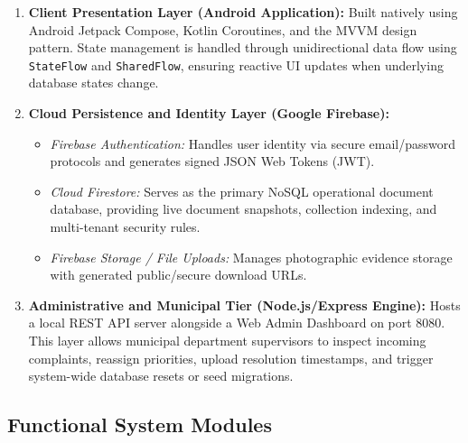 \documentclass[conference]{IEEEtran}
\begin{document}
\begin{enumerate}
    \item \textbf{Client Presentation Layer (Android Application):} Built natively using Android Jetpack Compose, Kotlin Coroutines, and the MVVM design pattern. State management is handled through unidirectional data flow using \texttt{StateFlow} and \texttt{SharedFlow}, ensuring reactive UI updates when underlying database states change.
    \item \textbf{Cloud Persistence and Identity Layer (Google Firebase):} 
    \begin{itemize}
        \item \textit{Firebase Authentication:} Handles user identity via secure email/password protocols and generates signed JSON Web Tokens (JWT).
        \item \textit{Cloud Firestore:} Serves as the primary NoSQL operational document database, providing live document snapshots, collection indexing, and multi-tenant security rules.
        \item \textit{Firebase Storage / File Uploads:} Manages photographic evidence storage with generated public/secure download URLs.
    \end{itemize}
    \item \textbf{Administrative and Municipal Tier (Node.js/Express Engine):} Hosts a local REST API server alongside a Web Admin Dashboard on port 8080. This layer allows municipal department supervisors to inspect incoming complaints, reassign priorities, upload resolution timestamps, and trigger system-wide database resets or seed migrations.
\end{enumerate}

\subsection{Functional System Modules}
\end{document}
